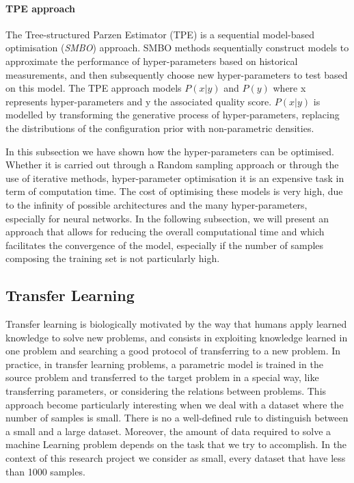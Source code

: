 \paragraph{TPE approach} \label{TPE approach}

The Tree-structured Parzen Estimator (TPE) is a sequential model-based optimisation (\textit{SMBO}) approach. SMBO methods sequentially construct models to approximate the performance of hyper-parameters based on historical measurements, and then subsequently choose new hyper-parameters to test based on this model. The TPE approach models $P(x|y)$ and $P(y)$ where x represents hyper-parameters and y the associated quality score. $P(x|y)$ is modelled by transforming the generative process of hyper-parameters, replacing the distributions of the configuration prior with non-parametric densities.

In this subsection we have shown how the hyper-parameters can be optimised. Whether it is carried out through a Random sampling approach or through the use of iterative methods, hyper-parameter optimisation it is an expensive task in term of computation time. The cost of optimising these models is very high, due to the inﬁnity of possible architectures and the many hyper-parameters, especially for neural networks. In the following subsection, we will present an approach that allows for reducing the overall computational time and which facilitates the convergence of the model, especially if the number of samples composing the training set is not particularly high.


\subsection{Transfer Learning} \label{Transfer Learning}

Transfer learning is biologically motivated by the way that humans apply learned knowledge to solve new problems, and consists in exploiting knowledge learned in one problem and searching a good protocol of transferring to a new problem.
In practice, in transfer learning problems, a parametric model is trained in the source problem and transferred to the target problem in a special way, like transferring parameters, or considering the relations between problems. This approach become particularly interesting when we deal with a dataset where the number of samples is small. There is no a well-defined rule to distinguish between a small and a large dataset. Moreover, the amount of data required to solve a machine Learning problem depends on the task that we try to accomplish. In the context of this research project we consider as small, every dataset that have less than 1000 samples. 

